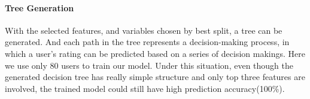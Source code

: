 \paragraph{Tree Generation}
With the selected features, and variables chosen by best split, a tree can be generated. And each path in the tree represents a decision-making process, in which a user's rating can be predicted based on a series of decision makings. Here we use only 80 users to train our model. Under this situation, even though the generated decision tree has really simple structure and only top three features are involved, the trained model could still have high prediction accuracy(100\%).